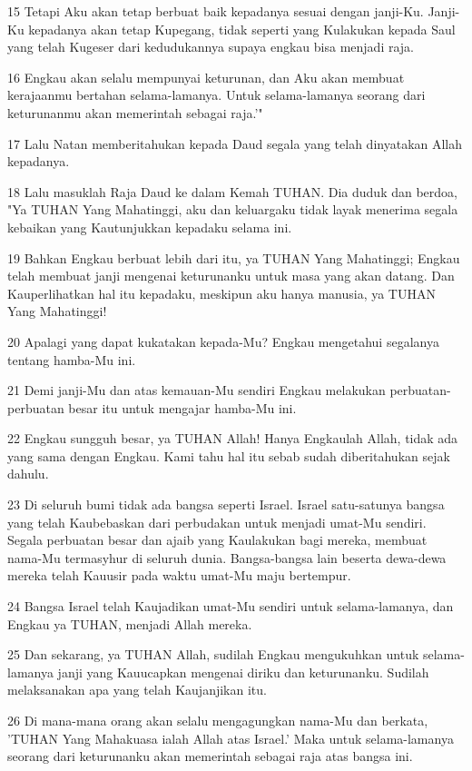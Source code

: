\par 15 Tetapi Aku akan tetap berbuat baik kepadanya sesuai dengan janji-Ku. Janji-Ku kepadanya akan tetap Kupegang, tidak seperti yang Kulakukan kepada Saul yang telah Kugeser dari kedudukannya supaya engkau bisa menjadi raja.
\par 16 Engkau akan selalu mempunyai keturunan, dan Aku akan membuat kerajaanmu bertahan selama-lamanya. Untuk selama-lamanya seorang dari keturunanmu akan memerintah sebagai raja.'"
\par 17 Lalu Natan memberitahukan kepada Daud segala yang telah dinyatakan Allah kepadanya.
\par 18 Lalu masuklah Raja Daud ke dalam Kemah TUHAN. Dia duduk dan berdoa, "Ya TUHAN Yang Mahatinggi, aku dan keluargaku tidak layak menerima segala kebaikan yang Kautunjukkan kepadaku selama ini.
\par 19 Bahkan Engkau berbuat lebih dari itu, ya TUHAN Yang Mahatinggi; Engkau telah membuat janji mengenai keturunanku untuk masa yang akan datang. Dan Kauperlihatkan hal itu kepadaku, meskipun aku hanya manusia, ya TUHAN Yang Mahatinggi!
\par 20 Apalagi yang dapat kukatakan kepada-Mu? Engkau mengetahui segalanya tentang hamba-Mu ini.
\par 21 Demi janji-Mu dan atas kemauan-Mu sendiri Engkau melakukan perbuatan-perbuatan besar itu untuk mengajar hamba-Mu ini.
\par 22 Engkau sungguh besar, ya TUHAN Allah! Hanya Engkaulah Allah, tidak ada yang sama dengan Engkau. Kami tahu hal itu sebab sudah diberitahukan sejak dahulu.
\par 23 Di seluruh bumi tidak ada bangsa seperti Israel. Israel satu-satunya bangsa yang telah Kaubebaskan dari perbudakan untuk menjadi umat-Mu sendiri. Segala perbuatan besar dan ajaib yang Kaulakukan bagi mereka, membuat nama-Mu termasyhur di seluruh dunia. Bangsa-bangsa lain beserta dewa-dewa mereka telah Kauusir pada waktu umat-Mu maju bertempur.
\par 24 Bangsa Israel telah Kaujadikan umat-Mu sendiri untuk selama-lamanya, dan Engkau ya TUHAN, menjadi Allah mereka.
\par 25 Dan sekarang, ya TUHAN Allah, sudilah Engkau mengukuhkan untuk selama-lamanya janji yang Kauucapkan mengenai diriku dan keturunanku. Sudilah melaksanakan apa yang telah Kaujanjikan itu.
\par 26 Di mana-mana orang akan selalu mengagungkan nama-Mu dan berkata, 'TUHAN Yang Mahakuasa ialah Allah atas Israel.' Maka untuk selama-lamanya seorang dari keturunanku akan memerintah sebagai raja atas bangsa ini.
